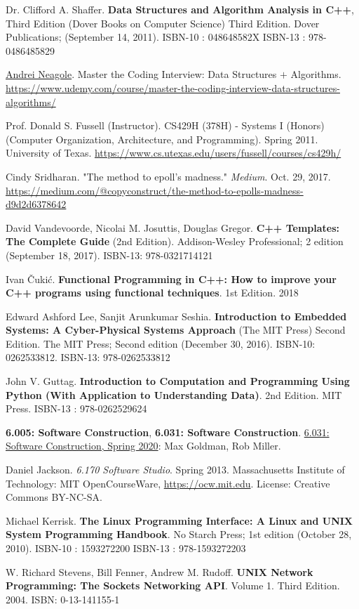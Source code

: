 \documentclass[10pt]{amsart}
\begin{document}
\begin{thebibliography}{9}
Dr. Clifford A. Shaffer. \textbf{Data Structures and Algorithm Analysis in C++}, Third Edition (Dover Books on Computer Science) Third Edition. Dover Publications; (September 14, 2011). ISBN-10 : 048648582X ISBN-13 : 978-0486485829 


\href{https://www.udemy.com/course/master-the-coding-interview-data-structures-algorithms/#instructor-1}{Andrei Neagole}. Master the Coding Interview: Data Structures $+$ Algorithms. 
\url{https://www.udemy.com/course/master-the-coding-interview-data-structures-algorithms/}

Prof. Donald S. Fussell (Instructor). CS429H (378H) - Systems I (Honors) (Computer Organization, Architecture, and Programming). Spring 2011. University of Texas. \url{https://www.cs.utexas.edu/users/fussell/courses/cs429h/}

 Cindy Sridharan. "The method to epoll's madness." \emph{Medium}. Oct. 29, 2017. \url{https://medium.com/@copyconstruct/the-method-to-epolls-madness-d9d2d6378642}

David Vandevoorde, Nicolai M. Josuttis, Douglas Gregor. \textbf{C++ Templates: The Complete Guide} (2nd Edition). Addison-Wesley Professional; 2 edition (September 18, 2017). ISBN-13: 978-0321714121

Ivan \v{C}uki\'{c}. \textbf{Functional Programming in C++: How to improve your C++ programs using functional techniques}. 1st Edition. 2018


Edward Ashford Lee, Sanjit Arunkumar Seshia. \textbf{Introduction to Embedded Systems: A Cyber-Physical Systems Approach} (The MIT Press) Second Edition. The MIT Press; Second edition (December 30, 2016). ISBN-10: 0262533812. ISBN-13: 978-0262533812

John V. Guttag. \textbf{Introduction to Computation and Programming Using Python (With Application to Understanding Data)}. 2nd Edition. 	MIT Press.  ISBN-13 : 978-0262529624 

\textbf{6.005: Software Construction}, \textbf{6.031: Software Construction}. \href{http://web.mit.edu/6.031/www/sp20/}{6.031: Software Construction, Spring 2020}: Max Goldman, Rob Miller.


Daniel Jackson. \emph{6.170 Software Studio}. Spring 2013. Massachusetts Institute of Technology: MIT OpenCourseWare, \url{https://ocw.mit.edu}. License: Creative Commons BY-NC-SA.

Michael Kerrisk. \textbf{The Linux Programming Interface: A Linux and UNIX System Programming Handbook}. No Starch Press; 1st edition (October 28, 2010). ISBN-10 : 1593272200 ISBN-13 : 978-1593272203 

W. Richard Stevens, Bill Fenner, Andrew M. Rudoff. \textbf{UNIX Network Programming: The Sockets Networking API}. Volume 1. Third Edition. 2004. ISBN: 0-13-141155-1


\end{thebibliography}
\end{document}
